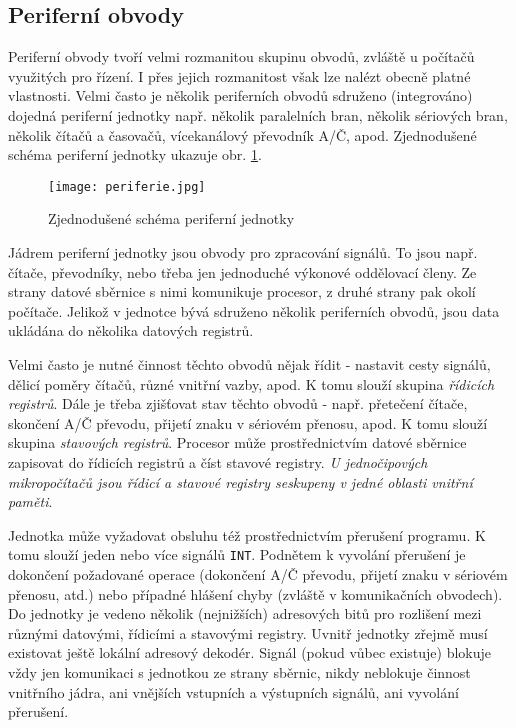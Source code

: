     \subsection{Periferní obvody}\label{ces:IchapIVsecIssecII}
      Periferní obvody tvoří velmi rozmanitou skupinu obvodů, zvlá\-ště u počítačů využitých pro 
      řízení. I přes jejich rozmanitost však lze nalézt obecně platné vlastnosti. Velmi často je 
      několik periferních obvodů sdruženo (integrováno) dojedná periferní jednotky např. několik 
      paralelních bran, několik sériových bran, několik čítačů a časovačů, vícekanálový převodník 
      A/Č, apod. Zjednodušené schéma periferní jednotky ukazuje obr. \ref{MIT:fig_periferie}.
      \begin{figure}[ht!] %
        \centering
        \texttt{[image: periferie.jpg]}
        \caption{Zjednodušené schéma periferní jednotky}
        \label{MIT:fig_periferie}
      \end{figure}
      
      Jádrem periferní jednotky jsou obvody pro zpracování signálů. To jsou např. čítače, 
      převodníky, nebo třeba jen jednoduché výkonové oddělovací členy. Ze strany datové sběrnice s 
      nimi komunikuje procesor, z druhé strany pak okolí počítače. Jelikož v jednotce bývá sdruženo 
      několik periferních obvodů, jsou data ukládána do několika datových registrů.
      
      Velmi často je nutné činnost těchto obvodů nějak řídit - nastavit cesty signálů, dělicí 
      poměry čítačů, různé vnitřní vazby, apod. K tomu slouží skupina \emph{řídicích registrů}. 
      Dále je třeba zjišťovat stav těchto obvodů - např. přetečení čítače, skončení A/Č převodu, 
      přijetí znaku v sériovém přenosu, apod. K tomu slouží skupina \emph{stavových registrů}. 
      Procesor může prostřednictvím datové sběrnice zapisovat do řídicích registrů a číst stavové 
      registry. \emph{U jednočipových mikropočítačů jsou řídicí a stavové registry seskupeny v 
      jedné oblasti vnitřní paměti}.
      
      Jednotka může vyžadovat obsluhu též prostřednictvím přerušení programu. K tomu slouží jeden 
      nebo více signálů \texttt{INT}. Podnětem k vyvolání přerušení je dokončení požadované operace 
      (dokončení A/Č převodu, přijetí znaku v sériovém přenosu, atd.) nebo případné hlášení chyby 
      (zvláště v komunikačních obvodech). Do jednotky je vedeno několik (nejnižších) adresových 
      bitů pro rozlišení mezi různými datovými, řídicími a stavovými registry. Uvnitř jednotky 
      zřejmě musí existovat ještě lokální adresový dekodér. Signál  
      (pokud vůbec existuje) blokuje vždy jen komunikaci s jednotkou ze strany sběrnic, nikdy 
      neblokuje činnost vnitřního jádra, ani vnějších vstupních a výstupních signálů, ani vyvolání 
      přerušení.
      
